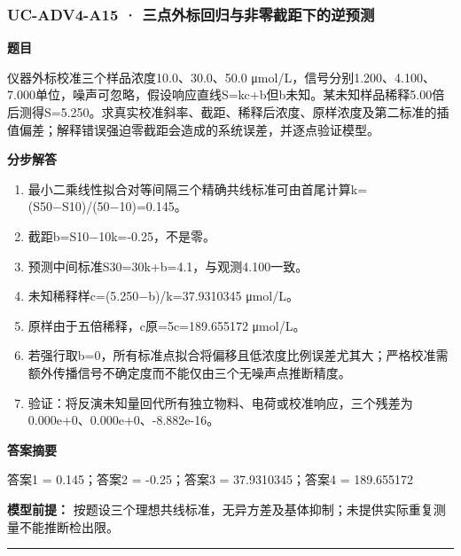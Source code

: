 \documentclass[UTF8,11pt,a4paper]{ctexart}
\begin{document}
\subsubsection*{UC-ADV4-A15 · 三点外标回归与非零截距下的逆预测}
\noindent\textbf{题目}\par
仪器外标校准三个样品浓度10.0、30.0、50.0 μmol/L，信号分别1.200、4.100、7.000单位，噪声可忽略，假设响应直线S=kc+b但b未知。某未知样品稀释5.00倍后测得S=5.250。求真实校准斜率、截距、稀释后浓度、原样浓度及第二标准的插值偏差；解释错误强迫零截距会造成的系统误差，并逐点验证模型。\par
\medskip\noindent\textbf{分步解答}
\begin{enumerate}
\item 最小二乘线性拟合对等间隔三个精确共线标准可由首尾计算k=(S50−S10)/(50−10)=0.145。
\item 截距b=S10−10k=-0.25，不是零。
\item 预测中间标准S30=30k+b=4.1，与观测4.100一致。
\item 未知稀释样c=(5.250−b)/k=37.9310345 μmol/L。
\item 原样由于五倍稀释，c原=5c=189.655172 μmol/L。
\item 若强行取b=0，所有标准点拟合将偏移且低浓度比例误差尤其大；严格校准需额外传播信号不确定度而不能仅由三个无噪声点推断精度。
\item 验证：将反演未知量回代所有独立物料、电荷或校准响应，三个残差为0.000e+0、0.000e+0、-8.882e-16。
\end{enumerate}
\noindent\textbf{答案摘要}\par
答案1 = 0.145；答案2 = -0.25；答案3 = 37.9310345；答案4 = 189.655172\par
\noindent\textbf{模型前提：}
按题设三个理想共线标准，无异方差及基体抑制；未提供实际重复测量不能推断检出限。\par
\medskip\hrule\medskip
{}
\end{document}
